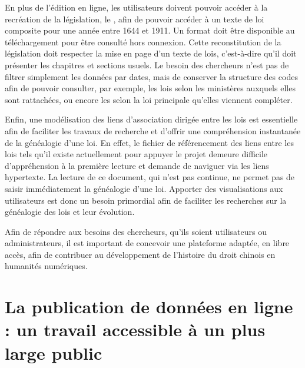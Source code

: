 En plus de l'édition en ligne, les utilisateurs doivent pouvoir accéder à la recréation de la législation, le \cv, afin de pouvoir accéder à un texte de loi composite pour une année entre 1644 et 1911. Un format \pdf doit être disponible au téléchargement pour être consulté hors connexion. Cette reconstitution de la législation doit respecter la mise en page d'un texte de lois, c'est-à-dire qu'il doit présenter les chapitres et sections usuels. Le besoin des chercheurs n'est pas de filtrer simplement les données par dates, mais de conserver la structure des codes afin de pouvoir consulter, par exemple, les lois selon les ministères auxquels elles sont rattachées, ou encore les \li selon la loi principale qu'elles viennent compléter. 

Enfin, une modélisation des liens d'association dirigée entre les lois est essentielle afin de faciliter les travaux de recherche et d'offrir une compréhension instantanée de la généalogie d'une loi. En effet, le fichier de référencement des liens entre les lois tels qu'il existe actuellement pour appuyer le projet demeure difficile d'appréhension à la première lecture et demande de naviguer via les liens hypertexte. La lecture de ce document, qui n'est pas continue, ne permet pas de saisir immédiatement la généalogie d'une loi. Apporter des visualisations aux utilisateurs est donc un besoin primordial afin de faciliter les recherches sur la généalogie des lois et leur évolution. 

Afin de répondre aux besoins des chercheurs, qu'ils soient utilisateurs ou administrateurs, il est important de concevoir une plateforme adaptée, en libre accès, afin de contribuer au développement de l'histoire du droit chinois en humanités numériques.

 \section{La publication de données en ligne : un travail accessible à un plus large public}
